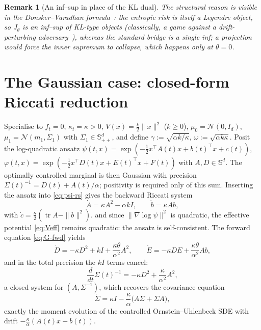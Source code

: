 \documentclass[letterpaper,10pt,conference]{IEEEtran}
\newtheorem{remark}{Remark}
\newcommand{\cN}{\mathcal{N}}
\begin{document}
	\begin{remark}[An inf--sup in place of the KL dual]
		\label{rem:dv}
		The structural reason is visible in the Donsker--Varadhan
		formula~\cite{donsker1975,follmerschied2016}: the entropic risk is itself
		a Legendre object, so $J_\theta$ is an inf--sup of KL-type objects (classically, a game against a drift-perturbing adversary~\cite{jacobson1973,basar1995}), whereas the standard
		bridge is a single inf; a projection would force the inner
		supremum to collapse, which happens only at $\theta=0$.
	\end{remark}
	
	\section{The Gaussian case: closed-form Riccati reduction}
	\label{sec:gaussian}
	
	Specialise to $f_t=0$, $\kappa_t=\kappa>0$, $V(x)=\frac{k}{2}\|x\|^2$
	($k\ge0$), $\mu_0=\cN(0,I_d)$, $\mu_1=\cN(m_1,\Sigma_1)$ with
	$\Sigma_1\in\mathbb{S}_{++}^d$, and define
	$\gamma:=\sqrt{\alpha k/\kappa}$, $\omega:=\sqrt{\alpha k\kappa}$. Posit the
	log-quadratic ansatz
	$\psi(t,x)=\exp(-\frac12 x^\top A(t)x+b(t)^\top x+c(t))$,
	$\varphi(t,x)=\exp(-\frac12 x^\top D(t)x+E(t)^\top x+F(t))$ with
	$A,D\in\mathbb{S}^d$. The optimally controlled marginal is then Gaussian
	with precision $\Sigma(t)^{-1}=D(t)+A(t)/\alpha$; positivity is required only
	of this sum.
	Inserting the ansatz into \eqref{eq:psi-rs} gives the backward Riccati system
	\begin{equation}
		\label{eq:riccati-A}
		\dot A=\kappa A^2-\alpha k I,\qquad
		\dot b=\kappa Ab,
	\end{equation}
	with $\dot c=\frac{\kappa}{2}(\operatorname{tr}A-\|b\|^2)$.
	and since $\|\nabla\log\psi\|^2$ is quadratic, the effective potential
	\eqref{eq:Veff} remains quadratic: the ansatz is self-consistent. The forward
	equation \eqref{eq:G-fwd} yields
	\begin{equation}
		\label{eq:riccati-D}
		\dot D=-\kappa D^2+kI+\frac{\kappa\theta}{\alpha^2}A^2,\qquad
		\dot E=-\kappa DE+\frac{\kappa\theta}{\alpha^2}Ab,
	\end{equation}
	and in the total precision the $kI$ terms cancel:
	\begin{equation}
		\label{eq:riccati-Lambda}
		\frac{d}{dt}\Sigma(t)^{-1}=-\kappa D^2+\frac{\kappa}{\alpha^2}A^2,
	\end{equation}
	a closed system for $(A,\Sigma^{-1})$, which recovers
	the covariance equation
	\begin{equation}
		\label{eq:cov-ode}
		\dot\Sigma=\kappa I-\frac{\kappa}{\alpha}\bigl(A\Sigma+\Sigma A\bigr),
	\end{equation}
	exactly the moment evolution of the controlled Ornstein--Uhlenbeck SDE with
	drift $-\frac{\kappa}{\alpha}(A(t)x-b(t))$.
	
\end{document}
